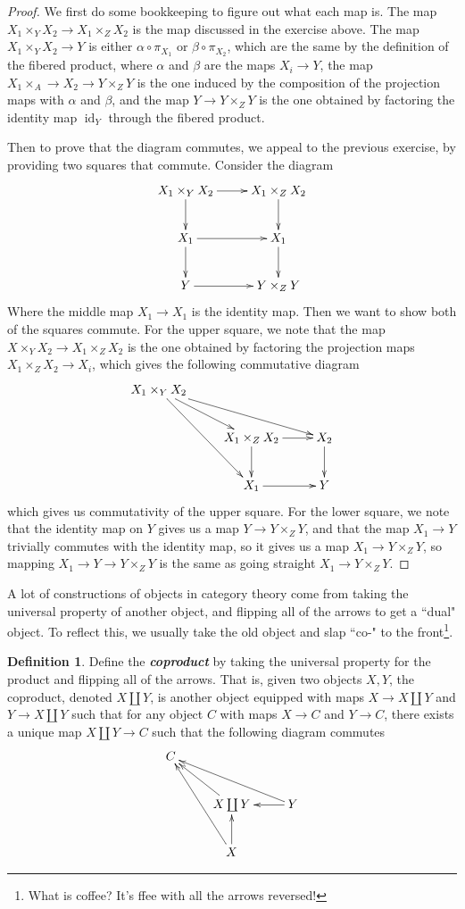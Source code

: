 \documentclass[psamsfonts]{amsart}
\theoremstyle{definition}
\newtheorem{defn}[thm]{Definition}
\theoremstyle{remark}
\newcommand{\ib}[1]{\textbf{\textit{#1}}}
\DeclareMathOperator{\id}{id}
\begin{document}
\begin{proof}
We first do some bookkeeping to figure out what each map is. The map $X_1 \times_Y X_2 \to X_1 \times_Z X_2$ is the map discussed in the exercise above. The map $X_1 \times_Y X_2 \to Y$ is either $\alpha \circ \pi_{X_1}$ or $\beta \circ \pi_{X_2}$, which are the same by the definition of the fibered product, where $\alpha$ and $\beta$ are the maps $X_i \to Y$, the map $X_1 \times_A \to X_2 \to Y \times_Z Y$ is the one induced by the composition of the projection maps with $\alpha$ and  $\beta$, and the map $Y \to Y \times_Z Y$ is the one obtained by factoring the identity map $\id_Y$ through the fibered product.

Then to prove that the diagram commutes, we appeal to the previous exercise, by providing two squares that commute. Consider the diagram
$$\xymatrix{
X_1 \times_Y X_2 \ar[r] \ar[d] & X_1 \times_Z X_2 \ar[d] \\
X_1 \ar[d] \ar[r] & X_1 \ar[d] \\
Y \ar[r] & Y \times_Z Y
}$$
Where the middle map $X_1 \to X_1$ is the identity map. Then we want to show both of the squares commute. For the upper square, we note that the map $X \times_Y X_2 \to X_1 \times_Z X_2$ is the one obtained by factoring the projection maps $X_1 \times_Z X_2 \to X_i$, which gives the following commutative diagram
$$\xymatrix{
X_1 \times_Y X_2  \ar[dr] \ar[drr] \ar[ddr]\\
& X_1 \times_Z X_2 \ar[r] \ar[d] & X_2 \ar[d]\\
& X_1 \ar[r] & Y
}$$
which gives us commutativity of the upper square. For the lower square, we note that the identity map on $Y$ gives us a map $Y \to Y \times_Z Y$, and that the map $X_1 \to Y$ trivially commutes with the identity map, so it gives us a map $X_1 \to Y \times_Z Y$, so mapping $X_1 \to Y \to Y\times_Z Y$ is the same as going straight $X_1 \to Y \times_Z Y$.
\end{proof}
A lot of constructions of objects in category theory come from taking the universal property of another object, and flipping all of the arrows to get a ``dual" object. To reflect this, we usually take the old object and slap ``co-" to the front\footnote{What is coffee? It's ffee with all the arrows reversed!}.
\begin{defn}
Define the \ib{coproduct} by taking the universal property for the product and flipping all of the arrows. That is, given two objects $X,Y$, the coproduct, denoted $X \coprod Y$, is another object equipped with maps $X \to X \coprod Y$ and $Y \to X \coprod Y$ such that for any object $C$ with maps $X \to C$ and $Y \to C$, there exists a unique map $X \coprod Y \to C$ such that the following diagram commutes
$$\xymatrix{
C \\
& X \coprod Y \ar[ul] & Y \ar[l] \ar[ull] \\
& X \ar[u] \ar[uul]
}$$
\end{defn}
\end{document}
